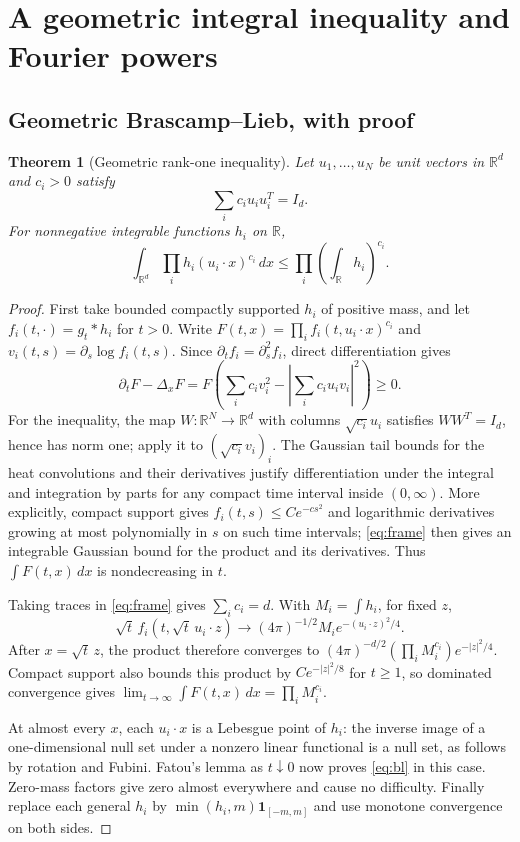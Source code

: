 \documentclass[11pt]{article}
\numberwithin{equation}{section}
\newtheorem{theorem}{Theorem}[section]
\theoremstyle{definition}\newtheorem{definition}[theorem]{Definition}
\theoremstyle{remark}\newtheorem{remark}[theorem]{Remark}
\newcommand{\R}{\mathbb R}\newcommand{\E}{\mathbb E}\newcommand{\PP}{\mathbb P}
\newcommand{\1}{\mathbf 1}\newcommand{\diag}{\operatorname{diag}}
\begin{document}
\section{A geometric integral inequality and Fourier powers}
\subsection{Geometric Brascamp--Lieb, with proof}
\begin{theorem}[Geometric rank-one inequality]\label{thm:bl}
Let $u_1,\ldots,u_N$ be unit vectors in $\R^d$ and $c_i>0$ satisfy
\begin{equation}\label{eq:frame}
 \sum_i c_i u_i u_i^T=I_d.
\end{equation}
For nonnegative integrable functions $h_i$ on $\R$,
\begin{equation}\label{eq:bl}
 \int_{\R^d}\prod_i h_i(u_i\cdot x)^{c_i}\,dx
 \le\prod_i\left(\int_\R h_i\right)^{c_i}.
\end{equation}
\end{theorem}
\begin{proof}
First take bounded compactly supported $h_i$ of positive mass, and let
$f_i(t,\cdot)=g_t*h_i$ for $t>0$. Write
$F(t,x)=\prod_i f_i(t,u_i\cdot x)^{c_i}$ and
$v_i(t,s)=\partial_s\log f_i(t,s)$. Since $\partial_t f_i=\partial_s^2 f_i$, direct differentiation gives
\[
 \partial_t F-\Delta_x F
 =F\left(\sum_i c_i v_i^2-
 \left|\sum_i c_i u_i v_i\right|^2\right)\ge0.
\]
For the inequality, the map $W:\R^N\to\R^d$ with columns $\sqrt{c_i}u_i$ satisfies $WW^T=I_d$, hence has norm one; apply it to $(\sqrt{c_i}v_i)_i$. The Gaussian tail bounds for the heat convolutions and their derivatives justify differentiation under the integral and integration by parts for any compact time interval inside $(0,\infty)$. More explicitly, compact support gives $f_i(t,s)\le C e^{-c s^2}$ and logarithmic derivatives growing at most polynomially in $s$ on such time intervals; \eqref{eq:frame} then gives an integrable Gaussian bound for the product and its derivatives. Thus $\int F(t,x)\,dx$ is nondecreasing in $t$.

Taking traces in \eqref{eq:frame} gives $\sum_i c_i=d$. With $M_i=\int h_i$, for fixed $z$,
\[
 \sqrt t\, f_i(t,\sqrt t\,u_i\cdot z)
 \longrightarrow (4\pi)^{-1/2}M_i e^{-(u_i\cdot z)^2/4}.
\]
After $x=\sqrt t\,z$, the product therefore converges to
$(4\pi)^{-d/2}(\prod_i M_i^{c_i})e^{-|z|^2/4}$.
Compact support also bounds this product by $C e^{-|z|^2/8}$ for $t\ge1$, so dominated convergence gives
$\lim_{t\to\infty}\int F(t,x)\,dx=\prod_i M_i^{c_i}$.

At almost every $x$, each $u_i\cdot x$ is a Lebesgue point of $h_i$: the inverse image of a one-dimensional null set under a nonzero linear functional is a null set, as follows by rotation and Fubini. Fatou's lemma as $t\downarrow0$ now proves \eqref{eq:bl} in this case. Zero-mass factors give zero almost everywhere and cause no difficulty. Finally replace each general $h_i$ by $\min(h_i,m)\1_{[-m,m]}$ and use monotone convergence on both sides.
\end{proof}
\end{document}
